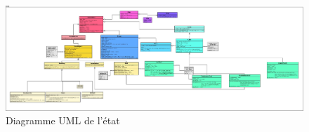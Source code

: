 \newpage

\begin{figure}[h]
    \centering
    \includegraphics[angle=270,origin=c,scale =0.12]{images/state.jpeg}
    \caption{Diagramme UML de l'état}
    \label{fig:Advance Wars}
\end{figure}



\newpage







